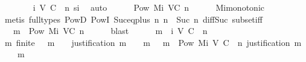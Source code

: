 \begin{isabellebody}
\ \ \ \ \isamarkupfalse%
\ {\isacartoucheopen}{\isasymsigma}\ {\isasymin}\ {\isasymSigma}i\ {\isacharparenleft}V{\isacharcomma}\ C{\isacharcomma}\ {\isasymepsilon}{\isacharparenright}\ n{\isacartoucheclose}\ si\ \isamarkupfalse%
\ auto\isanewline
\ \ \isamarkupfalse%
\ {\isachardoublequoteopen}{\isasymsigma}\ {\isasymin}\ Pow\ {\isacharparenleft}Mi\ {\isacharparenleft}V{\isacharcomma}C{\isacharcomma}{\isasymepsilon}{\isacharparenright}\ n{\isacharparenright}{\isachardoublequoteclose}\isanewline
\ \ \ \ \isamarkupfalse%
\ Mi{\isacharunderscore}monotonic\isanewline
\ \ \ \ \isamarkupfalse%
\ {\isacharparenleft}metis\ {\isacharparenleft}full{\isacharunderscore}types{\isacharparenright}\ PowD\ PowI\ Suc{\isacharunderscore}eq{\isacharunderscore}plus{}\ {\isacartoucheopen}{\isasymexists}n{\isacharprime}{\isachardot}\ n\ {\isacharequal}\ Suc\ n{\isacharprime}{\isacartoucheclose}\ diff{\isacharunderscore}Suc{\isacharunderscore}{}\ subset{\isacharunderscore}iff{\isacharparenright}\isanewline
\ \ \isamarkupfalse%
\ \isamarkupfalse%
\ {\isachardoublequoteopen}{\isasymsigma}\ {\isasymunion}\ {\isacharbraceleft}m{\isacharbraceright}\ {\isasymin}\ Pow\ {\isacharparenleft}Mi\ {\isacharparenleft}V{\isacharcomma}C{\isacharcomma}{\isasymepsilon}{\isacharparenright}\ n{\isacharparenright}{\isachardoublequoteclose}\isanewline
\ \ \ \ \isamarkupfalse%
\ blast\isanewline
\isanewline
\ \ \isamarkupfalse%
\ {\isachardoublequoteopen}{\isasymsigma}\ {\isasymunion}\ {\isacharbraceleft}m{\isacharbraceright}\ {\isasymin}\ {\isasymSigma}i\ {\isacharparenleft}V{\isacharcomma}\ C{\isacharcomma}\ {\isasymepsilon}{\isacharparenright}\ {\isacharparenleft}n\ {\isacharplus}\ {}{\isacharparenright}{\isachardoublequoteclose}\isanewline
\ \ \ \ \isamarkupfalse%
\ {\isacartoucheopen}{\isasymAnd}m{\isacharprime}{\isachardot}\ finite\ {\isasymsigma}\ {\isasymand}\ m{\isacharprime}\ {\isasymin}\ {\isasymsigma}\ {\isasymLongrightarrow}\ justification\ m{\isacharprime}\ {\isasymsubseteq}\ {\isasymsigma}\ {\isasymunion}\ {\isacharbraceleft}m{\isacharbraceright}{\isacartoucheclose}\ {\isacartoucheopen}{\isasymsigma}\ {\isasymunion}\ {\isacharbraceleft}m{\isacharbraceright}\ {\isasymin}\ Pow\ {\isacharparenleft}Mi\ {\isacharparenleft}V{\isacharcomma}\ C{\isacharcomma}\ {\isasymepsilon}{\isacharparenright}\ n{\isacharparenright}{\isacartoucheclose}\ {\isacartoucheopen}justification\ m\ {\isasymsubseteq}\ {\isasymsigma}\ {\isasymunion}\ {\isacharbraceleft}m{\isacharbraceright}{\isacartoucheclose}\ \isanewline

\end{isabellebody}
